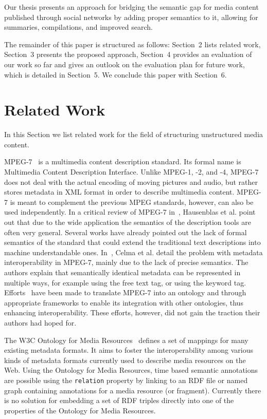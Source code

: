 \documentclass[runningheads,a4paper]{llncs}
\begin{document}
Our thesis presents an approach for bridging the semantic gap for media content published through social networks by adding proper semantics to it, allowing for summaries, compilations, and improved search. 

The remainder of this paper is structured as follows: Section~2 lists related work, Section~3 presents the proposed approach, Section~4 provides an evaluation of our work so far and gives an outlook on the evaluation plan for future work, which is detailed in Section~5. We conclude this paper with Section~6.

\section{Related Work}
In this Section we list related work for the field of structuring unstructured media content.

MPEG-7~\cite{mpeg7} is a multimedia content description standard. Its formal name is Multimedia Content Description Interface. Unlike MPEG-1, -2, and -4, MPEG-7 does not deal with the actual encoding of moving pictures and audio, but rather stores metadata in XML format in order to describe multimedia content. MPEG-7 is meant to complement the previous MPEG standards, however, can also be used independently. In a critical review of MPEG-7 in~\cite{Hau07}, Hausenblas et al. point out that due to the wide application the semantics of the description tools are often very general. Several works have already pointed out the lack of formal semantics of the standard that could extend the traditional text descriptions into machine understandable ones. In~\cite{Celma2007}, Celma et al. detail the problem with metadata interoperability in MPEG-7, mainly due to the lack of precise semantics. The authors explain that semantically identical metadata can be represented in multiple ways, for example using the free text tag, or using the keyword tag. Efforts~\cite{garca_semantic_2005-1} have been made to translate MPEG-7 into an ontology and through appropriate frameworks to enable its integration with other ontologies, thus enhancing interoperability. These efforts, however, did not gain the traction their authors had hoped for.

The W3C Ontology for Media Resources~\cite{mediaontology} defines a set of mappings for many existing metadata formats. It aims to foster the interoperability among various kinds of metadata formats currently used to describe media resources on the Web. Using the Ontology for Media Resources, time based semantic annotations are possible using the \texttt{relation} property by linking to an RDF file or named graph containing annotations for a media resource (or fragment). Currently there is no solution for embedding a set of RDF triples directly into one of the properties of the Ontology for Media Resources.
\end{document}

